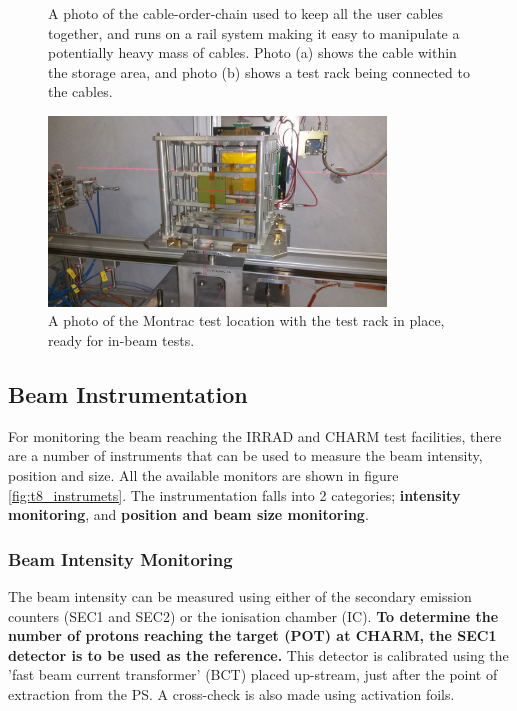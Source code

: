 \begin{figure}
\begin{subfigure}{.5\textwidth}
  \caption{}
  \label{fig:cable_chain2}
\end{subfigure}
\caption{A photo of the cable-order-chain used to keep all the user cables together, and runs on a rail system making it easy to manipulate a potentially heavy mass of cables. Photo (a) shows the cable within the storage area, and photo (b) shows a test rack being connected to the cables.}
\label{fig:cable_chain}
\end{figure}

\begin{figure}[!ht]
	\centering
	\includegraphics[width=0.8\textwidth]{./images/montrac_testbox2}
	\caption{A photo of the Montrac test location with the test rack in place, ready for in-beam tests.}
	\label{fig:montrac_testbox}
\end{figure}



\clearpage
\subsection{Beam Instrumentation}
For monitoring the beam reaching the IRRAD and CHARM test facilities, there are a number of instruments that can be used to measure the beam intensity, position and size. All the available monitors are shown in figure \ref{fig:t8_instrumets}. The instrumentation falls into 2 categories; \textbf{intensity monitoring}, and \textbf{position and beam size monitoring}. \\

\subsubsection{Beam Intensity Monitoring}

The beam intensity can be measured using either of the secondary emission counters (SEC1 and SEC2) or the ionisation chamber (IC). \textbf{To determine the number of protons reaching the target (POT) at CHARM, the SEC1 detector is to be used as the reference.} This detector is calibrated using the 'fast beam current transformer' (BCT) placed up-stream, just after the point of extraction from the PS. A cross-check is also made using activation foils. \\

